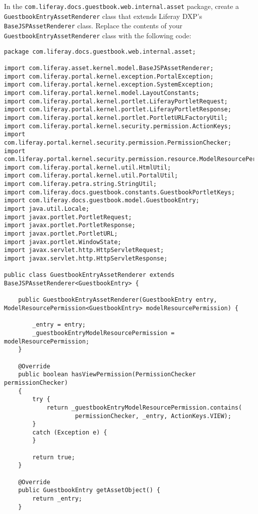 In the \texttt{com.liferay.docs.guestbook.web.internal.asset} package,
create a \texttt{GuestbookEntryAssetRenderer} class that extends Liferay
DXP's \texttt{BaseJSPAssetRenderer} class. Replace the contents of your
\texttt{GuestbookEntryAssetRenderer} class with the following code:

\begin{verbatim}
package com.liferay.docs.guestbook.web.internal.asset;

import com.liferay.asset.kernel.model.BaseJSPAssetRenderer;
import com.liferay.portal.kernel.exception.PortalException;
import com.liferay.portal.kernel.exception.SystemException;
import com.liferay.portal.kernel.model.LayoutConstants;
import com.liferay.portal.kernel.portlet.LiferayPortletRequest;
import com.liferay.portal.kernel.portlet.LiferayPortletResponse;
import com.liferay.portal.kernel.portlet.PortletURLFactoryUtil;
import com.liferay.portal.kernel.security.permission.ActionKeys;
import com.liferay.portal.kernel.security.permission.PermissionChecker;
import com.liferay.portal.kernel.security.permission.resource.ModelResourcePermission;
import com.liferay.portal.kernel.util.HtmlUtil;
import com.liferay.portal.kernel.util.PortalUtil;
import com.liferay.petra.string.StringUtil;
import com.liferay.docs.guestbook.constants.GuestbookPortletKeys;
import com.liferay.docs.guestbook.model.GuestbookEntry;
import java.util.Locale;
import javax.portlet.PortletRequest;
import javax.portlet.PortletResponse;
import javax.portlet.PortletURL;
import javax.portlet.WindowState;
import javax.servlet.http.HttpServletRequest;
import javax.servlet.http.HttpServletResponse;

public class GuestbookEntryAssetRenderer extends BaseJSPAssetRenderer<GuestbookEntry> {

    public GuestbookEntryAssetRenderer(GuestbookEntry entry, ModelResourcePermission<GuestbookEntry> modelResourcePermission) {

        _entry = entry;
        _guestbookEntryModelResourcePermission = modelResourcePermission;
    }

    @Override
    public boolean hasViewPermission(PermissionChecker permissionChecker) 
    {
        try {
            return _guestbookEntryModelResourcePermission.contains(
                    permissionChecker, _entry, ActionKeys.VIEW);
        }
        catch (Exception e) {
        }

        return true;
    }

    @Override
    public GuestbookEntry getAssetObject() {
        return _entry;
    }


\end{verbatim}
